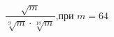 \begin{ex}[type=calculate_expression]
	\begin{condition}
		\( \dfrac{\sqrt{m}}{\sqrt[9]{m}\cdot\sqrt[18]{m}} \),\quad при \( m=64 \)
	\end{condition}
\end{ex}